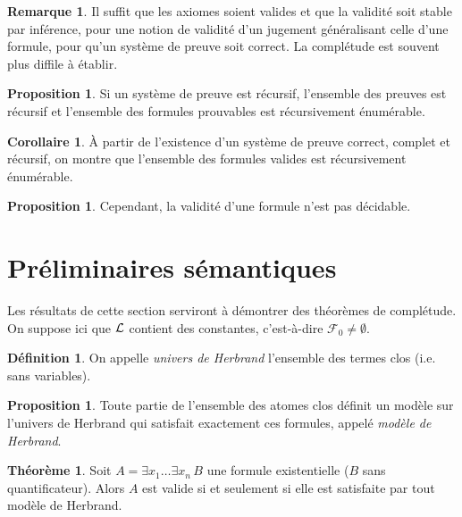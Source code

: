 \documentclass[a4paper, 11pt, twocolumn]{article}
\theoremstyle{definition}
\newtheorem{definition}[equation]{Définition}
\newtheorem{proposition}[equation]{Proposition}
\newtheorem{theorem}[equation]{Théorème}
\newtheorem{remark}[equation]{Remarque}
\newtheorem{corollary}[equation]{Corollaire}
\newcounter{n}
\def\L{{\cal{L}}}
\begin{document}
\begin{remark}
  Il suffit que les axiomes soient valides et que la validité soit stable par
  inférence, pour une notion de validité d'un jugement généralisant celle d'une
  formule, pour qu'un système de preuve soit correct. La complétude est souvent
  plus diffile à établir.
\end{remark}

\begin{proposition}
  Si un système de preuve est récursif, l'ensemble des preuves est récursif et
  l'ensemble des formules prouvables est récursivement énumérable.
\end{proposition}

\begin{corollary}
  À partir de l'existence d'un système de preuve correct, complet et récursif, on montre
  que l'ensemble des formules valides est récursivement énumérable.
\end{corollary}

\begin{proposition}
  Cependant, la validité d'une formule n'est pas décidable.
\end{proposition}

\section{Préliminaires sémantiques}

Les résultats de cette section serviront à démontrer des théorèmes de
complétude. On suppose ici que $\L$ contient des constantes, c'est-à-dire
$\mathcal{F}_0 \neq \emptyset$.

\begin{definition}
  On appelle \emph{univers de Herbrand} l'ensemble des termes clos (i.e. sans
  variables).
\end{definition}

\begin{proposition}
  Toute partie de l'ensemble des atomes clos définit un modèle sur l'univers de
  Herbrand qui satisfait exactement ces formules, appelé \emph{modèle de
    Herbrand}.
\end{proposition}

\begin{theorem}
  Soit $A = \exists x_1 \ldots \exists x_n\, B$ une formule existentielle ($B$
  sans quantificateur). Alors $A$ est valide si et seulement si elle est
  satisfaite par tout modèle de Herbrand.
\end{theorem}
\end{document}
